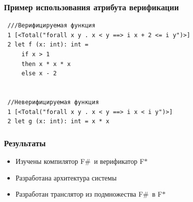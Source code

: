 \documentclass{beamer}
\def \fstar {F$\ast$}
\def \fsharp {F$\#$}
\begin{document}
\begin{frame}[fragile]
  \transwipe[direction=90]
  \frametitle{Пример использования атрибута верификации}
  \begin{verbatim}
 ///Верифицируемая функция
 1 [<Total("forall x y . x < y ==> i x + 2 <= i y")>]
 2 let f (x: int): int =
     if x > 1
     then x * x * x
     else x - 2 
 
 
 //Неверифицируемая функция
 1 [<Total("forall x y . x < y ==> i x < i y")>]
 2 let g (x: int): int = x * x
  \end{verbatim}
\end{frame}

\begin{frame}
  \transwipe[direction=90]
  \frametitle{Результаты}
  \begin{itemize}
    \item Изучены компилятор \fsharp~и верификатор \fstar
    \item Разработана архитектура системы
    \item Разработан транслятор из подмножества \fsharp~в \fstar
  \end{itemize}
\end{frame}
\end{document}
